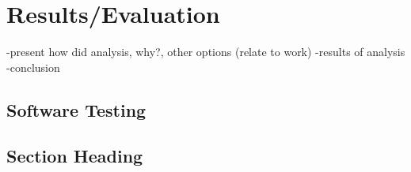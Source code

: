 \chapter{Results/Evaluation}
-present how did analysis, why?, other options (relate to work)
-results of analysis
-conclusion
\section{Software Testing}

\section{Section Heading}

